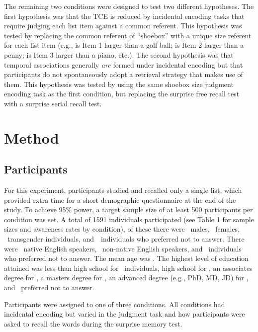 \documentclass[man,natbib,floatsintext]{apa6} %
\begin{document}
The remaining two conditions were designed to test two different hypotheses.
The first hypothesis was that the TCE is reduced by incidental encoding tasks that require judging each list item against a common referent. This hypothesis was tested by replacing the common referent of ``shoebox'' with a unique size referent for each list item (e.g., is Item 1 larger than a golf ball; is Item 2 larger than a penny; is Item 3 larger than a piano, etc.). The second hypothesis was that temporal associations generally \emph{are} formed under incidental encoding but that participants do not spontaneously adopt a retrieval strategy that makes use of them. This hypothesis was tested by using the same shoebox size judgment encoding task as the first condition, but replacing the surprise free recall test with a surprise serial recall test.

\section{Method}
\label{TODO-8}
\subsection{Participants}
For this experiment, participants studied and recalled only a single list, which provided extra time for a short demographic questionnaire at the end of the study. To achieve 95\% power, a target sample size of at least 500 participants per condition was set. A total of 1591 individuals participated (see Table 1 for sample sizes and awareness rates by condition), of these there were \males~males, \females~females, \others~transgender individuals, and~\notans~individuals who preferred not to answer. There were \engY~native English speakers, \engN~non-native English speakers, and \engS~individuals who preferred not to answer.  The mean age was \age. The highest level of education attained was less than high school for \noed~individuals, high school for \hschool, an associates degree for \ass, a masters degree for \mas, an advanced degree (e.g., PhD, MD, JD) for \phd, and \notansed~preferred not to answer.

Participants were assigned to one of three conditions. All conditions had incidental encoding but varied in the judgment task and how participants were asked to recall the words during the surprise memory test.
\end{document}
